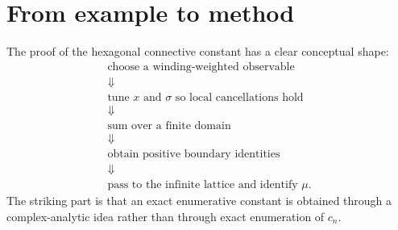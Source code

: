 \section{From example to method}

The proof of the hexagonal connective constant has a clear conceptual shape:
\[
\begin{array}{c}
\text{choose a winding-weighted observable}\\
\Downarrow\\
\text{tune }x\text{ and }\sigma\text{ so local cancellations hold}\\
\Downarrow\\
\text{sum over a finite domain}\\
\Downarrow\\
\text{obtain positive boundary identities}\\
\Downarrow\\
\text{pass to the infinite lattice and identify }\mu.
\end{array}
\]
The striking part is that an exact enumerative constant is obtained through a complex-analytic idea rather than through exact enumeration of \(c_n\).
